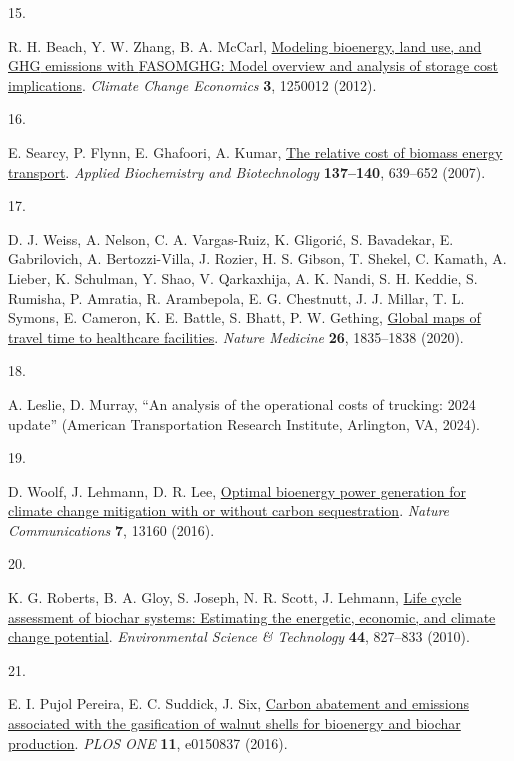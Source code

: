 \documentclass[
  letterpaper,
]{article}
\newlength{\cslhangindent}
\newlength{\csllabelwidth}
\newenvironment{CSLReferences}[2] %
 {\begin{list}{}{%
  \setlength{\itemindent}{0pt}
  \setlength{\leftmargin}{0pt}
  \setlength{\parsep}{0pt}
  \ifodd #1
   \setlength{\leftmargin}{\cslhangindent}
   \setlength{\itemindent}{-1\cslhangindent}
  \fi
  \setlength{\itemsep}{#2\baselineskip}}}
 {\end{list}}
\newcommand{\CSLLeftMargin}[1]{\parbox[t]{\csllabelwidth}{\strut#1\strut}}
\newcommand{\CSLRightInline}[1]{\parbox[t]{\linewidth - \csllabelwidth}{\strut#1\strut}}
\begin{document}
\begin{CSLReferences}{0}{1}
\CSLLeftMargin{15. }%
\CSLRightInline{R. H. Beach, Y. W. Zhang, B. A. McCarl,
\href{https://doi.org/10.1142/S2010007812500121}{Modeling bioenergy,
land use, and {GHG} emissions with {FASOMGHG}: Model overview and
analysis of storage cost implications}. \emph{Climate Change Economics}
\textbf{3}, 1250012 (2012).}

\CSLLeftMargin{16. }%
\CSLRightInline{E. Searcy, P. Flynn, E. Ghafoori, A. Kumar,
\href{https://doi.org/10.1007/s12010-007-9085-8}{The relative cost of
biomass energy transport}. \emph{Applied Biochemistry and Biotechnology}
\textbf{137--140}, 639--652 (2007).}

\CSLLeftMargin{17. }%
\CSLRightInline{D. J. Weiss, A. Nelson, C. A. Vargas-Ruiz, K. Gligorić,
S. Bavadekar, E. Gabrilovich, A. Bertozzi-Villa, J. Rozier, H. S.
Gibson, T. Shekel, C. Kamath, A. Lieber, K. Schulman, Y. Shao, V.
Qarkaxhija, A. K. Nandi, S. H. Keddie, S. Rumisha, P. Amratia, R.
Arambepola, E. G. Chestnutt, J. J. Millar, T. L. Symons, E. Cameron, K.
E. Battle, S. Bhatt, P. W. Gething,
\href{https://doi.org/10.1038/s41591-020-1059-1}{Global maps of travel
time to healthcare facilities}. \emph{Nature Medicine} \textbf{26},
1835--1838 (2020).}

\CSLLeftMargin{18. }%
\CSLRightInline{A. Leslie, D. Murray, {``An analysis of the operational
costs of trucking: 2024 update''} (American Transportation Research
Institute, Arlington, VA, 2024).}

\CSLLeftMargin{19. }%
\CSLRightInline{D. Woolf, J. Lehmann, D. R. Lee,
\href{https://doi.org/10.1038/ncomms13160}{Optimal bioenergy power
generation for climate change mitigation with or without carbon
sequestration}. \emph{Nature Communications} \textbf{7}, 13160 (2016).}

\CSLLeftMargin{20. }%
\CSLRightInline{K. G. Roberts, B. A. Gloy, S. Joseph, N. R. Scott, J.
Lehmann, \href{https://doi.org/10.1021/es902266r}{Life cycle assessment
of biochar systems: Estimating the energetic, economic, and climate
change potential}. \emph{Environmental Science \& Technology}
\textbf{44}, 827--833 (2010).}

\CSLLeftMargin{21. }%
\CSLRightInline{E. I. Pujol Pereira, E. C. Suddick, J. Six,
\href{https://doi.org/10.1371/journal.pone.0150837}{Carbon abatement and
emissions associated with the gasification of walnut shells for
bioenergy and biochar production}. \emph{PLOS ONE} \textbf{11}, e0150837
(2016).}


\end{CSLReferences}
\end{document}
